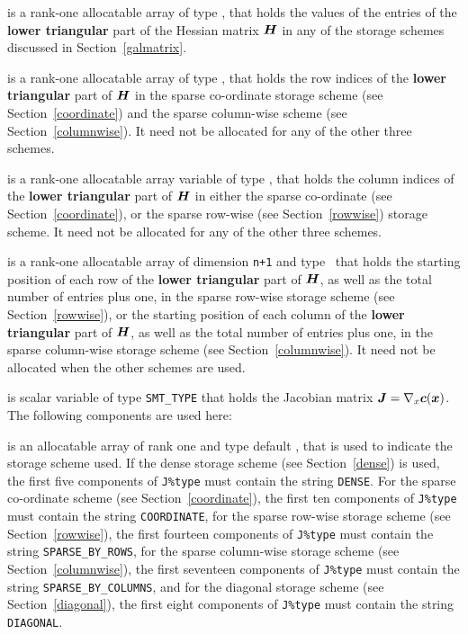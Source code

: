 \documentclass{galahad}
\begin{document}
\begin{description}
\begin{description}
 is a rank-one allocatable array of type \realdp, that holds
the values of the entries of the {\bf lower triangular} part
of the Hessian matrix ${\bm{H}}$ in any of the 
storage schemes discussed in Section~\ref{galmatrix}.

 is a rank-one allocatable array of type \integer,
that holds the row indices of the {\bf lower triangular} part of ${\bm{H}}$ 
in the sparse co-ordinate storage
scheme (see Section~\ref{coordinate}) and the sparse column-wise
scheme (see Section~\ref{columnwise}). 
It need not be allocated for any of the other three schemes.

 is a rank-one allocatable array variable of type \integer,
that holds the column indices of the {\bf lower triangular} part of 
${\bm{H}}$ in either the sparse co-ordinate 
(see Section~\ref{coordinate}), or the sparse row-wise 
(see Section~\ref{rowwise}) storage scheme.
It need not be allocated for any of the other three schemes.

 is a rank-one allocatable array of dimension {\tt n+1} and type 
\integer\ that holds the starting position of 
each row of the {\bf lower triangular} part of ${\bm{H}}$, as well
as the total number of entries plus one, in the sparse row-wise storage
scheme (see Section~\ref{rowwise}), or the starting position of 
each column of the {\bf lower triangular} part of ${\bm{H}}$, as well
as the total number of entries plus one, in the sparse column-wise storage
scheme (see Section~\ref{columnwise}).
It need not be allocated when the other schemes are used.

\end{description}

 is scalar variable of type {\tt SMT\_TYPE} 
that holds the Jacobian matrix ${\bm{J}}=\nabla_x{\bm{c}}({\bm{x}})$. The following components
are used here:

\begin{description}

 is an allocatable array of rank one and type default 
\character, that
is used to indicate the storage scheme used. If the dense storage scheme 
(see Section~\ref{dense}) is used, 
the first five components of {\tt J\%type} must contain the
string {\tt DENSE}.
For the sparse co-ordinate scheme (see Section~\ref{coordinate}), 
the first ten components of {\tt J\%type} must contain the
string {\tt COORDINATE},  
for the sparse row-wise storage scheme (see Section~\ref{rowwise}),
the first fourteen components of {\tt J\%type} must contain the
string {\tt SPARSE\_BY\_ROWS},
for the sparse column-wise storage scheme (see Section~\ref{columnwise}),
the first seventeen components of {\tt J\%type} must contain the
string {\tt SPARSE\_BY\_COLUMNS},
and for the diagonal storage scheme (see Section~\ref{diagonal}),
the first eight components of {\tt J\%type} must contain the
string {\tt DIAGONAL}.


\end{description}
\end{description}
\end{document}
